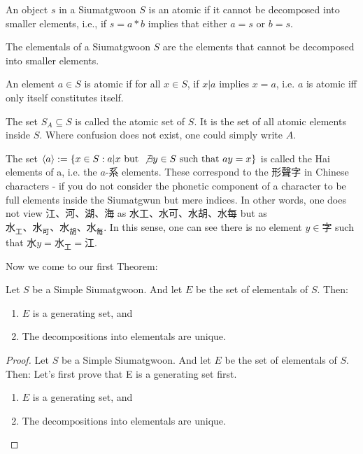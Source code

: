\begin{definition}[Atomics]\label{def:atomics}
    An object $s$ in a Siumatgwoon $S$ is an atomic if it cannot be decomposed into smaller elements, i.e., if $s = a * b$ implies that either $a = s$ or $b = s$.
\end{definition}




\begin{definition}[Elementals]\label{def:elementals}
    The elementals of a Siumatgwoon $S$ are the elements that cannot be decomposed into smaller elements.
\end{definition}


\begin{definition}\label{def:atomic-element}
An element $a \in S$ is atomic if for all $x\in S$, if $x|a$ implies $x=a$, i.e. $a$ is atomic iff only itself constitutes itself.
\end{definition}

\begin{definition}\label{def:atomic-set}
The set $S_A \subseteq S$ is called the atomic set of $S$. It is the set of all atomic elements inside $S$. Where confusion does not exist, one could simply write $A$.
\end{definition}

\begin{definition}\label{def:hai-elements}
The set $\langle a \rangle := \{ x\in S: a|x \text{ but } \not \exists y \in S \text{ such that } ay=x\}$ is called the Hai elements of a, i.e. the $a$-系 elements. These correspond to the 形聲字 in Chinese characters - if you do not consider the phonetic component of a character to be full elements inside the Siumatgwun but mere indices. In other words, one does not view 江、河、湖、海 as 水工、水可、水胡、水每 but as $水_工、水_可、水_胡、水_每$. In this sense, one can see there is no element $y \in 字$ such that $水y=水_工=江$.
\end{definition}


Now we come to our first Theorem: 
\begin{theorem}
    Let $S$ be a Simple Siumatgwoon. And let $E$ be the set of elementals of $S$. Then: 
    \begin{enumerate}
        \item $E$ is a generating set, and 
        \item The decompositions into elementals are unique.
    \end{enumerate}
\end{theorem}
\begin{proof}
    Let $S$ be a Simple Siumatgwoon. And let $E$ be the set of elementals of $S$. Then: 
    Let's first prove that E is a generating set first.
    \begin{enumerate}
        \item $E$ is a generating set, and 
        \item The decompositions into elementals are unique.
    \end{enumerate}
\end{proof}


